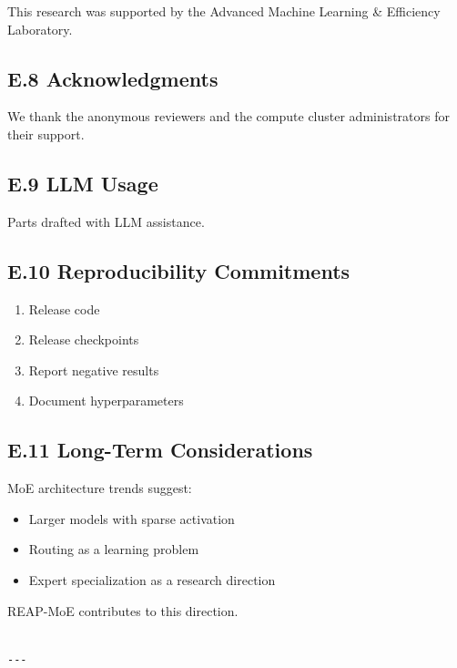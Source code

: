This research was supported by the Advanced Machine Learning \& Efficiency Laboratory.

\subsection{E.8 Acknowledgments}

We thank the anonymous reviewers and the compute cluster administrators for their support.

\subsection{E.9 LLM Usage}

Parts drafted with LLM assistance.

\subsection{E.10 Reproducibility Commitments}

\begin{enumerate}
\item Release code
\item Release checkpoints
\item Report negative results
\item Document hyperparameters

\end{enumerate}
\subsection{E.11 Long-Term Considerations}

MoE architecture trends suggest:
\begin{itemize}
\item Larger models with sparse activation
\item Routing as a learning problem
\item Expert specialization as a research direction

\end{itemize}
REAP-MoE contributes to this direction.
\begin{lstlisting}

---
\end{lstlisting}

